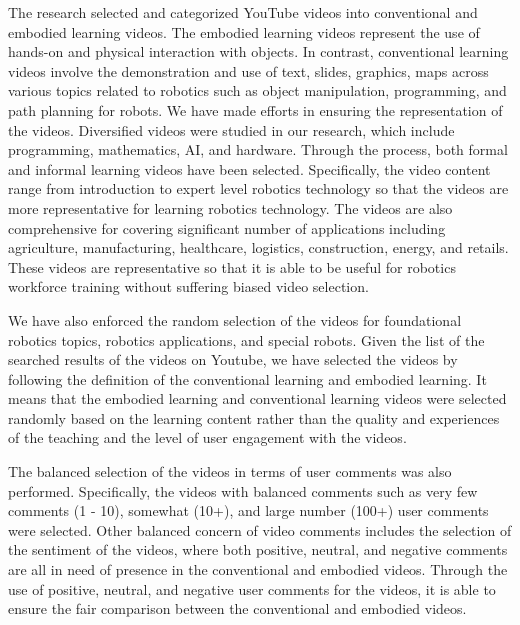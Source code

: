 The research selected and categorized YouTube videos into conventional and embodied learning videos. The embodied learning videos represent the use of hands-on and physical interaction with objects. In contrast, conventional learning videos involve the demonstration and use of text, slides, graphics, maps across various topics related to robotics such as object manipulation, programming, and path planning for robots. We have made efforts in ensuring the representation of the videos. Diversified videos were studied in our research, which include programming, mathematics, AI, and hardware. Through the process, both formal and informal learning videos have been selected. Specifically, the video content range from introduction to expert level robotics technology so that the videos are more representative for learning robotics technology. The videos are also comprehensive for covering significant number of applications including agriculture, manufacturing, healthcare, logistics, construction, energy, and retails. These videos are representative so that it is able to be useful for robotics workforce training without suffering biased video selection. 

We have also enforced the random selection of the videos for foundational robotics topics, robotics applications, and special robots. Given the list of the searched results of the videos on Youtube, we have selected the videos by following the definition of the conventional learning and embodied learning. It means that the embodied learning and conventional learning videos were selected randomly based on the learning content rather than the quality and experiences of the teaching and the level of user engagement with the videos.  %

The balanced selection of the videos in terms of user comments was also performed. Specifically, the videos with balanced comments such as very few comments (1 - 10), somewhat (10+), and large number (100+) user comments were selected. Other balanced concern of video comments includes the selection of the sentiment of the videos, where both positive, neutral, and negative comments are all in need of presence in the conventional and embodied videos. Through the use of positive, neutral, and negative user comments for the videos, it is able to ensure the fair comparison between the conventional and embodied videos.   

